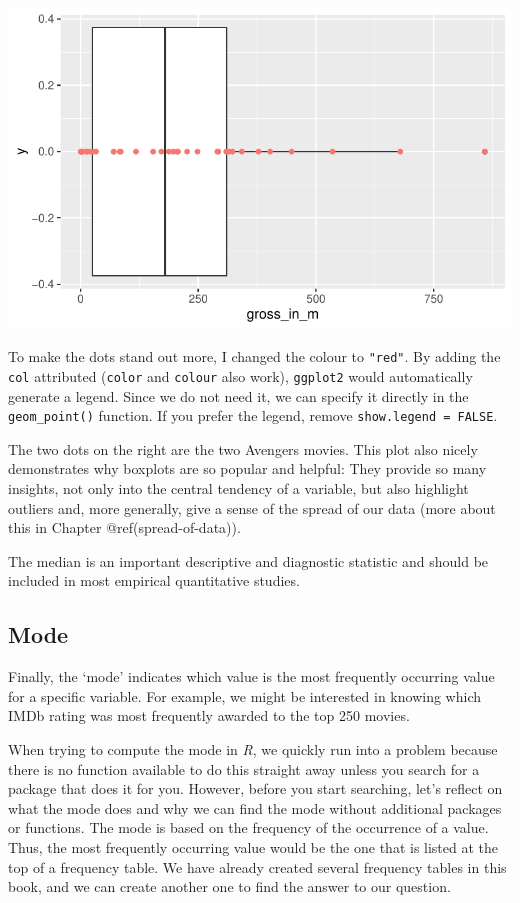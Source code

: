 \documentclass[
  letterpaper,
]{krantz}
\begin{document}
\includegraphics{08_descriptive_statistics_files/figure-pdf/boxplot-plus-geom-point-action-movies-1.pdf}

To make the dots stand out more, I changed the colour to \texttt{"red"}.
By adding the \texttt{col} attributed (\texttt{color} and
\texttt{colour} also work), \texttt{ggplot2} would automatically
generate a legend. Since we do not need it, we can specify it directly
in the \texttt{geom\_point()} function. If you prefer the legend, remove
\texttt{show.legend\ =\ FALSE}.

The two dots on the right are the two Avengers movies. This plot also
nicely demonstrates why boxplots are so popular and helpful: They
provide so many insights, not only into the central tendency of a
variable, but also highlight outliers and, more generally, give a sense
of the spread of our data (more about this in Chapter
@ref(spread-of-data)).

The median is an important descriptive and diagnostic statistic and
should be included in most empirical quantitative studies.

\subsection{Mode}\label{sec-mode}

Finally, the `mode' indicates which value is the most frequently
occurring value for a specific variable. For example, we might be
interested in knowing which IMDb rating was most frequently awarded to
the top 250 movies.

When trying to compute the mode in \emph{R}, we quickly run into a
problem because there is no function available to do this straight away
unless you search for a package that does it for you. However, before
you start searching, let's reflect on what the mode does and why we can
find the mode without additional packages or functions. The mode is
based on the frequency of the occurrence of a value. Thus, the most
frequently occurring value would be the one that is listed at the top of
a frequency table. We have already created several frequency tables in
this book, and we can create another one to find the answer to our
question.
\end{document}
